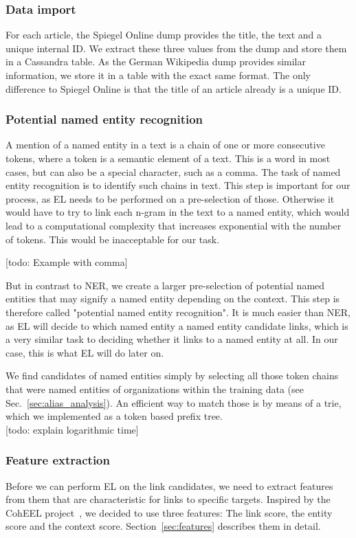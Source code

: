 \subsubsection{Data import}
For each article, the Spiegel Online dump provides the title, the text and a unique internal ID. We extract these three values from the dump and store them in a Cassandra table. As the German Wikipedia dump provides similar information, we store it in a table with the exact same format. The only difference to Spiegel Online is that the title of an article already is a unique ID.\\

\subsubsection{Potential named entity recognition}
A mention of a named entity in a text is a chain of one or more consecutive tokens, where a token is a semantic element of a text. This is a word in most cases, but can also be a special character, such as a comma. The task of named entity recognition is to identify such chains in text. This step is important for our process, as EL needs to be performed on a pre-selection of those. Otherwise it would have to try to link each n-gram in the text to a named entity, which would lead to a computational complexity that increases exponential with the number of tokens. This would be inacceptable for our task.

[todo: Example with comma]

But in contrast to NER, we create a larger pre-selection of potential named entities that may signify a named entity depending on the context. This step is therefore called "potential named entity recognition". It is much easier than NER, as EL will decide to which named entity a named entity candidate links, which is a very similar task to deciding whether it links to a named entity at all. In our case, this is what EL will do later on.

We find candidates of named entities simply by selecting all those token chains that were named entities of organizations within the training data (see Sec.~\ref{sec:alias_analysis}). An efficient way to match those is by means of a trie, which we implemented as a token based prefix tree.\\

[todo: explain logarithmic time]


\subsubsection{Feature extraction}
Before we can perform EL on the link candidates, we need to extract features from them that are characteristic for links to specific targets. Inspired by the CohEEL project~\cite{coheel}, we decided to use three features: The link score, the entity score and the context score. Section~\ref{sec:features} describes them in detail.

